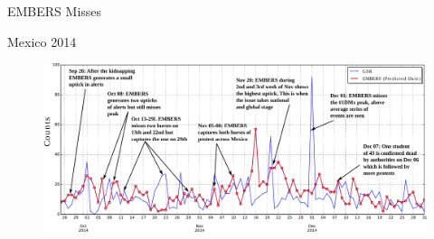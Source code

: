     









\begin{frame}{EMBERS Misses}
\begin{center}
    Mexico 2014
\end{center}
    \begin{figure}
        \centering
        \includegraphics[width=\textwidth]{Problem1/figures/mx_timeline.pdf}
    \end{figure}
\end{frame}

